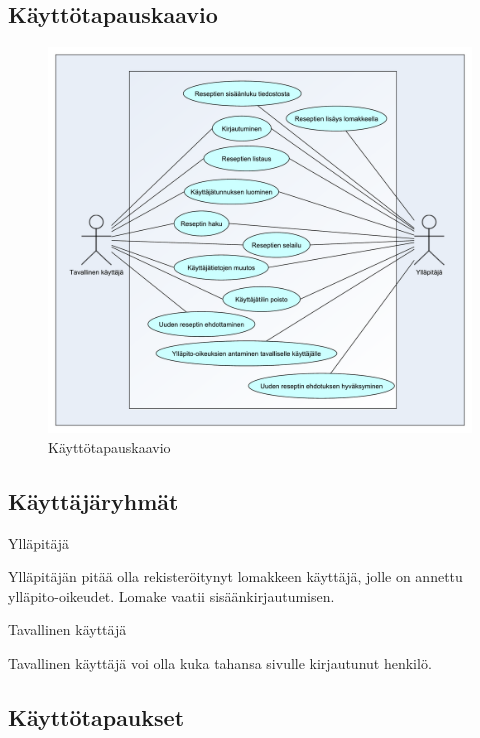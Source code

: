 \documentclass[a4paper]{article}
\begin{document}
\subsection{Käyttötapauskaavio}
\begin{figure}[h]
	\centering
	\includegraphics[scale=0.4]{kayttotapaukset.pdf}
	\caption{Käyttötapauskaavio}
\end{figure}
	
\subsection{Käyttäjäryhmät}

\begin{flushleft}Ylläpitäjä\end{flushleft}

Ylläpitäjän pitää olla rekisteröitynyt lomakkeen käyttäjä, jolle on annettu ylläpito-oikeudet. Lomake vaatii sisäänkirjautumisen.

\begin{flushleft}Tavallinen käyttäjä\end{flushleft}

Tavallinen käyttäjä voi olla kuka tahansa sivulle kirjautunut henkilö. 

\newpage
\subsection{Käyttötapaukset}
\end{document}
